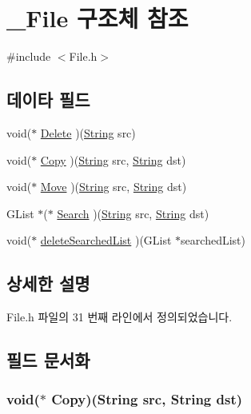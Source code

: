 \hypertarget{struct___file}{\section{\-\_\-\-File 구조체 참조}
\label{struct___file}
}


{\ttfamily \#include $<$File.\-h$>$}

\subsection*{데이타 필드}
\begin{DoxyCompactItemize}
\item 
void($\ast$ \hyperlink{struct___file_a53d84115a9c66fe30c652f908da6d3b7}{Delete} )(\hyperlink{dit_8h_a2efe6d463d80744789f228f5dc4baa39}{String} src)
\item 
void($\ast$ \hyperlink{struct___file_a92496803181c17bf9099dd7a8daf15b9}{Copy} )(\hyperlink{dit_8h_a2efe6d463d80744789f228f5dc4baa39}{String} src, \hyperlink{dit_8h_a2efe6d463d80744789f228f5dc4baa39}{String} dst)
\item 
void($\ast$ \hyperlink{struct___file_a7eb122224c5bd93834784151526da9e2}{Move} )(\hyperlink{dit_8h_a2efe6d463d80744789f228f5dc4baa39}{String} src, \hyperlink{dit_8h_a2efe6d463d80744789f228f5dc4baa39}{String} dst)
\item 
G\-List $\ast$($\ast$ \hyperlink{struct___file_a4372eaf72ad5ad415c0dc75a3420e1bb}{Search} )(\hyperlink{dit_8h_a2efe6d463d80744789f228f5dc4baa39}{String} src, \hyperlink{dit_8h_a2efe6d463d80744789f228f5dc4baa39}{String} dst)
\item 
void($\ast$ \hyperlink{struct___file_a688001b808e44b036dac30773decb791}{delete\-Searched\-List} )(G\-List $\ast$searched\-List)
\end{DoxyCompactItemize}


\subsection{상세한 설명}


File.\-h 파일의 31 번째 라인에서 정의되었습니다.



\subsection{필드 문서화}
\hypertarget{struct___file_a92496803181c17bf9099dd7a8daf15b9}{
\subsubsection[{Copy}]{\setlength{\rightskip}{0pt plus 5cm}void($\ast$  Copy)({\bf String} src, {\bf String} dst)}}\label{struct___file_a92496803181c17bf9099dd7a8daf15b9}


